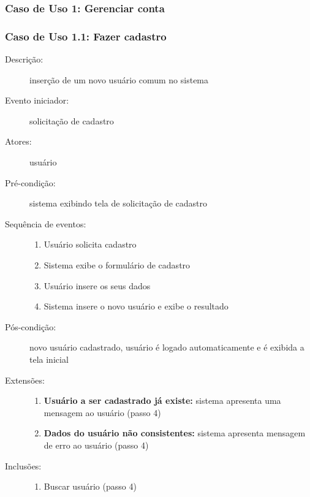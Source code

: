 \subsubsection{Caso de Uso 1: Gerenciar conta}
\subsubsection{Caso de Uso 1.1: Fazer cadastro}
\begin{description}
	\item[Descrição:] inserção de um novo usuário comum no sistema
	\item[Evento iniciador:] solicitação de cadastro
	\item[Atores:] usuário
	\item[Pré-condição:] sistema exibindo tela de solicitação de cadastro
	\item[Sequência de eventos:] \hfill
		\begin{enumerate}
			\item{Usuário solicita cadastro}
			\item{Sistema exibe o formulário de cadastro}
			\item{Usuário insere os seus dados}
			\item{Sistema insere o novo usuário e exibe o resultado}
		\end{enumerate}
	\item[Pós-condição:] novo usuário cadastrado, usuário é logado automaticamente e é exibida a tela inicial
	\item[Extensões:] \hfill
		\begin{enumerate}
			\item{\textbf{Usuário a ser cadastrado já existe:} sistema apresenta uma mensagem ao usuário (passo 4)}
			\item{\textbf{Dados do usuário não consistentes:} sistema apresenta mensagem de erro ao usuário (passo 4)}
		\end{enumerate}
	\item[Inclusões:] \hfill
		\begin{enumerate}
			\item{Buscar usuário (passo 4)}
		\end{enumerate}
\end{description}
%
